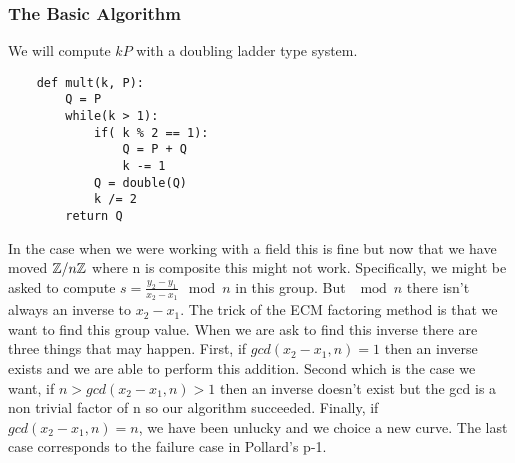 \documentclass{article}
\begin{document}
\subsubsection{The Basic Algorithm}
We will compute $k P$ with a doubling ladder type system.
\begin{verbatim}
    def mult(k, P):
        Q = P
        while(k > 1):
            if( k % 2 == 1):
                Q = P + Q
                k -= 1
            Q = double(Q)
            k /= 2
        return Q
\end{verbatim}

In the case when we were working with a field this is fine but now that we have moved $\mathbb{Z} / n \mathbb{Z}$ where n is composite this might not work. Specifically, we might be asked to compute $s = \frac{y_2 - y_1}{x_2 -x_1} \mod n$ in this group. But $\mod n$ there isn't always an inverse to $x_2 - x_1$. The trick of the ECM factoring method is that we want to find this group value.  When we are ask to find this inverse there are three things that may happen. First, if $gcd(x_2 - x_1 , n) = 1$ then an inverse exists and we are able to perform this addition. Second which is the case we want, if $n > gcd(x_2 - x_1, n) > 1$ then an inverse doesn't exist but the gcd is a non trivial factor of n so our algorithm succeeded. Finally, if $gcd(x_2 - x_1, n) = n$, we have been unlucky and we choice a new curve.  The last case corresponds to the failure case in Pollard's p-1. 
\end{document}
